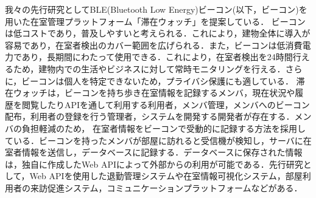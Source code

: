 我々の先行研究としてBLE(Bluetooth Low Energy)ビーコン(以下，ビーコン)を用いた在室管理プラットフォーム「滞在ウォッチ」を提案している．
ビーコンは低コストであり，普及しやすいと考えられる．これにより，建物全体に導入が容易であり，在室者検出のカバー範囲を広げられる．また，ビーコンは低消費電力であり，長期間にわたって使用できる．これにより，在室者検出を24時間行えるため，建物内での生活やビジネスに対して常時モニタリングを行える．さらに，ビーコンは個人を特定できないため，プライバシ保護にも適している．
滞在ウォッチは，ビーコンを持ち歩き在室情報を記録するメンバ，現在状況や履歴を閲覧したりAPIを通して利用する利用者，メンバ管理，メンバへのビーコン配布，利用者の登録を行う管理者，システムを開発する開発者が存在する．メンバの負担軽減のため，
在室者情報をビーコンで受動的に記録する方法を採用している．ビーコンを持ったメンバが部屋に訪れると受信機が検知し，サーバに在室者情報を送信し，データベースに記録する．データベースに保存された情報は，独自に作成したWeb APIによって外部からの利用が可能である．先行研究として，Web APIを使用した退勤管理システムや在室情報可視化システム，部屋利用者の来訪促進システム，コミュニケーションプラットフォームなどがある．


